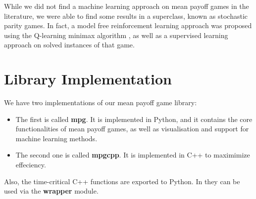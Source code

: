 While we did not find a machine learning approach on mean payoff games in the literature, we were able to find some results in a superclass, known as stochastic parity games. In fact, a model free reinforcement learning approach was proposed using the Q-learning minimax algorithm , as well as a supervised learning approach on solved instances of that game.

\section{Library Implementation}
We have two implementations of our mean payoff game library:
\begin{itemize}
	\item The first is called \textbf{mpg}. It is implemented in Python, and it contains the core functionalities of mean payoff games, as well as visualisation and support for machine learning methods.
	\item The second one is called \textbf{mpgcpp}. It is implemented in C++ to maximimize effeciency.
\end{itemize}
Also, the time-critical C++ functions are exported to Python. In they can be used via the \textbf{wrapper} module.

